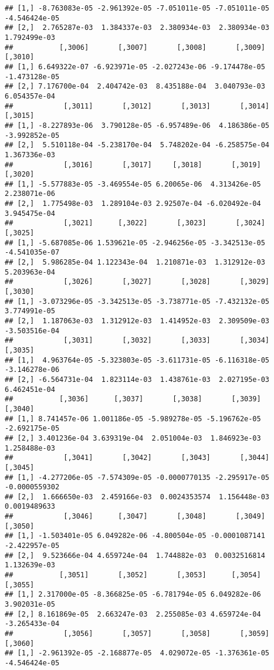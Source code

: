 \documentclass[
]{article}
\begin{document}
\begin{verbatim}
## [1,] -8.763083e-05 -2.961392e-05 -7.051011e-05 -7.051011e-05 -4.546424e-05
## [2,]  2.765287e-03  1.384337e-03  2.380934e-03  2.380934e-03  1.792499e-03
##           [,3006]       [,3007]       [,3008]       [,3009]       [,3010]
## [1,] 6.649322e-07 -6.923971e-05 -2.027243e-06 -9.174478e-05 -1.473128e-05
## [2,] 7.176700e-04  2.404742e-03  8.435188e-04  3.040793e-03  6.054357e-04
##            [,3011]       [,3012]       [,3013]       [,3014]       [,3015]
## [1,] -8.227893e-06  3.790128e-05 -6.957489e-06  4.186386e-05 -3.992852e-05
## [2,]  5.510118e-04 -5.238170e-04  5.748202e-04 -6.258575e-04  1.367336e-03
##            [,3016]       [,3017]     [,3018]       [,3019]      [,3020]
## [1,] -5.577883e-05 -3.469554e-05 6.20065e-06  4.313426e-05 2.238071e-06
## [2,]  1.775498e-03  1.289104e-03 2.92507e-04 -6.020492e-04 3.945475e-04
##            [,3021]      [,3022]       [,3023]       [,3024]       [,3025]
## [1,] -5.687085e-06 1.539621e-05 -2.946256e-05 -3.342513e-05 -4.541035e-07
## [2,]  5.986285e-04 1.122343e-04  1.210871e-03  1.312912e-03  5.203963e-04
##            [,3026]       [,3027]       [,3028]       [,3029]       [,3030]
## [1,] -3.073296e-05 -3.342513e-05 -3.738771e-05 -7.432132e-05  3.774991e-05
## [2,]  1.187063e-03  1.312912e-03  1.414952e-03  2.309509e-03 -3.503516e-04
##            [,3031]       [,3032]       [,3033]       [,3034]       [,3035]
## [1,]  4.963764e-05 -5.323803e-05 -3.611731e-05 -6.116318e-05 -3.146278e-06
## [2,] -6.564731e-04  1.823114e-03  1.438761e-03  2.027195e-03  6.462451e-04
##           [,3036]      [,3037]       [,3038]       [,3039]       [,3040]
## [1,] 8.741457e-06 1.001186e-05 -5.989278e-05 -5.196762e-05 -2.692175e-05
## [2,] 3.401236e-04 3.639319e-04  2.051004e-03  1.846923e-03  1.258488e-03
##            [,3041]       [,3042]       [,3043]       [,3044]       [,3045]
## [1,] -4.277206e-05 -7.574309e-05 -0.0000770135 -2.295917e-05 -0.0000559302
## [2,]  1.666650e-03  2.459166e-03  0.0024353574  1.156448e-03  0.0019489633
##            [,3046]      [,3047]       [,3048]       [,3049]       [,3050]
## [1,] -1.503401e-05 6.049282e-06 -4.800504e-05 -0.0001087141 -2.422957e-05
## [2,]  9.523666e-04 4.659724e-04  1.744882e-03  0.0032516814  1.132639e-03
##           [,3051]       [,3052]       [,3053]      [,3054]       [,3055]
## [1,] 2.317000e-05 -8.366825e-05 -6.781794e-05 6.049282e-06  3.902031e-05
## [2,] 8.161869e-05  2.663247e-03  2.255085e-03 4.659724e-04 -3.265433e-04
##            [,3056]       [,3057]       [,3058]       [,3059]       [,3060]
## [1,] -2.961392e-05 -2.168877e-05  4.029072e-05 -1.376361e-05 -4.546424e-05

\end{verbatim}
\end{document}
